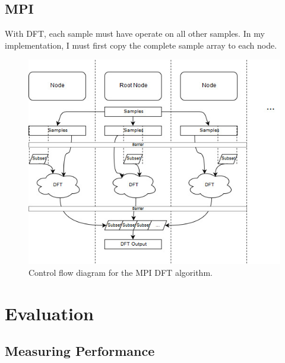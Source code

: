 \documentclass[11pt,a4paper]{article}
\begin{document}
\subsection{MPI}
With DFT, each sample must have operate on all other samples. In my implementation, I must first copy the complete sample array to each node. 

\begin{figure}[H]
\begin{center}
\includegraphics[scale=0.7]{mpi_impl1}
\end{center}
\caption{Control flow diagram for the MPI DFT algorithm.}
\label{fig:train10x}
\end{figure}

\section{Evaluation}
\subsection{Measuring Performance}
\end{document}
